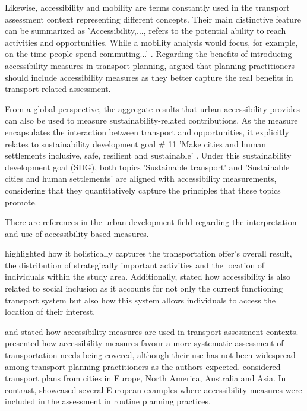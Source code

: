 \documentclass[12pt, a4paper]{report}
\begin{document}

Likewise, accessibility and mobility are terms constantly used in the transport assessment context representing different concepts. Their main distinctive feature can be summarized 
as 'Accessibility,..., refers to the potential ability to reach activities and opportunities. While a mobility analysis would focus, for example, on the time people spend commuting...' \cite{pereiraIntroductionUrbanAccessibility2023a}. Regarding the benefits of introducing accessibility measures in transport planning, \cite{ferreiraAccessibilityGoldMobility2012} argued that planning practitioners should include accessibility measures as they better capture the real benefits in transport-related assessment.


From a global perspective, the aggregate results that urban accessibility provides can also be used to measure sustainability-related contributions. As the measure encapsulates the interaction between transport and opportunities, it explicitly relates to sustainability development goal \# 11 'Make cities and human settlements inclusive, safe, resilient and sustainable' \citep{unitednations17GOALSSustainable2015}. Under this sustainability development goal (SDG), both topics 'Sustainable transport' and 'Sustainable cities and human settlements' are aligned with accessibility measurements, considering that they quantitatively capture the principles that these topics promote.

There are references in the urban development field regarding the interpretation and use of accessibility-based measures.  

\cite{pereiraIntroductionUrbanAccessibility2023a} highlighted how it holistically captures the transportation offer's overall result, the distribution of strategically important activities and the location of individuals within the study area. Additionally, \cite{pereiraIntroductionUrbanAccessibility2023a} stated how accessibility is also related to social inclusion as it accounts for not only the current functioning transport system but also how this system allows individuals to access the location of their interest.

\cite{papaAccessibilityInstrumentsPlanning2016} and \cite{boisjolyHowGetThere2017} stated how accessibility measures are used in transport assessment contexts. \cite{boisjolyHowGetThere2017} presented how accessibility measures favour a more systematic assessment of transportation needs being covered, although their use has not been widespread among transport planning practitioners as the authors expected. \cite{boisjolyHowGetThere2017} considered transport plans from cities in Europe, North America, Australia and Asia.
In contrast, \cite{papaAccessibilityInstrumentsPlanning2016} showcased several European examples where accessibility measures were included in the assessment in routine planning practices.
\end{document}
